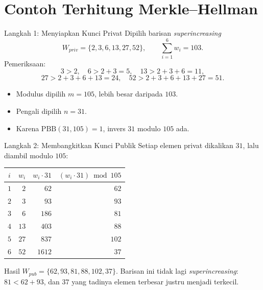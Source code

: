 \documentclass[aspectratio=169,11pt]{beamer}
\begin{document}
\section{Contoh Terhitung Merkle--Hellman}

\begin{frame}{Langkah 1: Menyiapkan Kunci Privat}
    Dipilih barisan \textit{superincreasing}
    \[
        W_{priv} = \{2, 3, 6, 13, 27, 52\},
        \qquad \sum_{i=1}^{6} w_i = 103.
    \]
    Pemeriksaan:
    \[
        3>2,\quad 6>2+3=5,\quad 13>2+3+6=11,
    \]
    \[
        27>2+3+6+13=24,\quad 52>2+3+6+13+27=51.
    \]
    \begin{itemize}
        \item Modulus dipilih $m = 105$, lebih besar daripada $103$.
        \item Pengali dipilih $n = 31$.
        \item Karena $\mathrm{PBB}(31,105)=1$, invers $31$ modulo $105$ ada.
    \end{itemize}
\end{frame}

\begin{frame}{Langkah 2: Membangkitkan Kunci Publik}
    Setiap elemen privat dikalikan $31$, lalu diambil modulo $105$:
    \vspace{0.1cm}
    \centering
    \footnotesize
    \begin{tabular}{@{}c r r r@{}}
        \toprule
        $i$ & $w_i$ & $w_i \cdot 31$ & $(w_i \cdot 31) \bmod 105$ \\
        \midrule
        $1$ & $2$  & $62$   & $62$  \\
        $2$ & $3$  & $93$   & $93$  \\
        $3$ & $6$  & $186$  & $81$  \\
        $4$ & $13$ & $403$  & $88$  \\
        $5$ & $27$ & $837$  & $102$ \\
        $6$ & $52$ & $1612$ & $37$  \\
        \bottomrule
    \end{tabular}
    \vspace{0.15cm}
    \raggedright
    \begin{exampleblock}{Hasil}
        \footnotesize
        $W_{pub} = \{62, 93, 81, 88, 102, 37\}$. Barisan ini tidak lagi
        \textit{superincreasing}: $81 < 62+93$, dan $37$ yang tadinya elemen
        terbesar justru menjadi terkecil.
    \end{exampleblock}
\end{frame}
\end{document}
